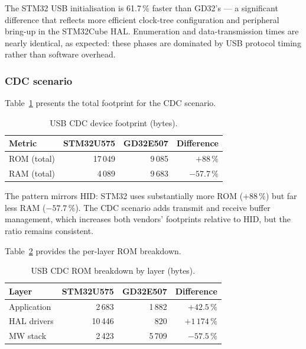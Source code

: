 The STM32 USB initialisation is 61.7\,\% faster than GD32's --- a significant difference
that reflects more efficient clock-tree configuration and peripheral bring-up in the
STM32Cube HAL. Enumeration and data-transmission times are nearly identical, as expected:
these phases are dominated by USB protocol timing rather than software overhead.

\subsubsection{CDC scenario}
\label{sec:gd32-usb-cdc}

Table~\ref{tab:gd32-usb-cdc-footprint} presents the total footprint for the CDC scenario.

\begin{table}[H]
  \centering
  \caption{USB CDC device footprint (bytes).}
  \label{tab:gd32-usb-cdc-footprint}
  \begin{tabular}{l r r r}
    \toprule
    \textbf{Metric} & \textbf{STM32U575} & \textbf{GD32E507} & \textbf{Difference} \\
    \midrule
    ROM (total) & 17\,049 & 9\,085  & $+88\,\%$ \\
    RAM (total) & 4\,089  & 9\,683  & $-57.7\,\%$ \\
    \bottomrule
  \end{tabular}
\end{table}

The pattern mirrors HID: STM32 uses substantially more ROM ($+88\,\%$) but far less RAM
($-57.7\,\%$). The CDC scenario adds transmit and receive buffer management, which
increases both vendors' footprints relative to HID, but the ratio remains consistent.

Table~\ref{tab:gd32-usb-cdc-rom} provides the per-layer ROM breakdown.

\begin{table}[H]
  \centering
  \caption{USB CDC ROM breakdown by layer (bytes).}
  \label{tab:gd32-usb-cdc-rom}
  \begin{tabular}{l r r r}
    \toprule
    \textbf{Layer} & \textbf{STM32U575} & \textbf{GD32E507} & \textbf{Difference} \\
    \midrule
    Application    & 2\,683  & 1\,882 & $+42.5\,\%$ \\
    HAL drivers    & 10\,446 & 820    & $+1\,174\,\%$ \\
    MW stack       & 2\,423  & 5\,709 & $-57.5\,\%$ \\
    \bottomrule
  \end{tabular}
\end{table}


